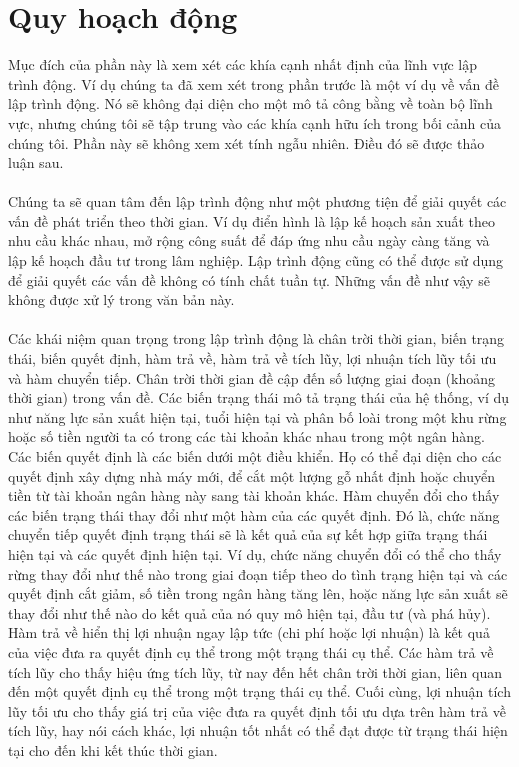 \documentclass[12pt,a4paper]{report}
\begin{document}
	\section{Quy hoạch động}
		Mục đích của phần này là xem xét các khía cạnh nhất định của lĩnh vực lập trình động. Ví dụ chúng ta đã xem xét trong phần trước là một ví dụ về vấn đề lập trình động. Nó sẽ không đại diện cho một mô tả công bằng về toàn bộ lĩnh vực, nhưng chúng tôi sẽ tập trung vào các khía cạnh hữu ích trong bối cảnh của chúng tôi. Phần này sẽ không xem xét tính ngẫu nhiên. Điều đó sẽ được thảo luận sau.\\\\
		Chúng ta sẽ quan tâm đến lập trình động như một phương tiện để giải quyết các vấn đề phát triển theo thời gian. Ví dụ điển hình là lập kế hoạch sản xuất theo nhu cầu khác nhau, mở rộng công suất để đáp ứng nhu cầu ngày càng tăng và lập kế hoạch đầu tư trong lâm nghiệp. Lập trình động cũng có thể được sử dụng để giải quyết các vấn đề không có tính chất tuần tự. Những vấn đề như vậy sẽ không được xử lý trong văn bản này.\\\\
		Các khái niệm quan trọng trong lập trình động là chân trời thời gian, biến trạng thái, biến quyết định, hàm trả về, hàm trả về tích lũy, lợi nhuận tích lũy tối ưu và hàm chuyển tiếp. Chân trời thời gian đề cập đến số lượng giai đoạn (khoảng thời gian) trong vấn đề. Các biến trạng thái mô tả trạng thái của hệ thống, ví dụ như năng lực sản xuất hiện tại, tuổi hiện tại và phân bố loài trong một khu rừng hoặc số tiền người ta có trong các tài khoản khác nhau trong một ngân hàng. Các biến quyết định là các biến dưới một điều khiển. Họ có thể đại diện cho các quyết định xây dựng nhà máy mới, để cắt một lượng gỗ nhất định hoặc chuyển tiền từ tài khoản ngân hàng này sang tài khoản khác. Hàm chuyển đổi cho thấy các biến trạng thái thay đổi như một hàm của các quyết định. Đó là, chức năng chuyển tiếp quyết định trạng thái sẽ là kết quả của sự kết hợp giữa trạng thái hiện tại và các quyết định hiện tại. Ví dụ, chức năng chuyển đổi có thể cho thấy rừng thay đổi như thế nào trong giai đoạn tiếp theo do tình trạng hiện tại và các quyết định cắt giảm, số tiền trong ngân hàng tăng lên, hoặc năng lực sản xuất sẽ thay đổi như thế nào do kết quả của nó quy mô hiện tại, đầu tư (và phá hủy). Hàm trả về hiển thị lợi nhuận ngay lập tức (chi phí hoặc lợi nhuận) là kết quả của việc đưa ra quyết định cụ thể trong một trạng thái cụ thể. Các hàm trả về tích lũy cho thấy hiệu ứng tích lũy, từ nay đến hết chân trời thời gian, liên quan đến một quyết định cụ thể trong một trạng thái cụ thể. Cuối cùng, lợi nhuận tích lũy tối ưu cho thấy giá trị của việc đưa ra quyết định tối ưu dựa trên hàm trả về tích lũy, hay nói cách khác, lợi nhuận tốt nhất có thể đạt được từ trạng thái hiện tại cho đến khi kết thúc thời gian.\\\\
\end{document}
